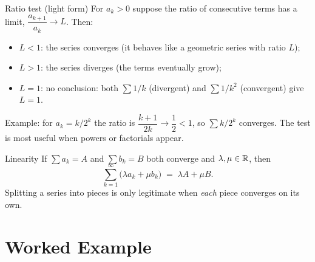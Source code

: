 \begin{rulebox}{Ratio test (light form)}
For $a_k>0$ suppose the ratio of consecutive terms has a limit,
$\dfrac{a_{k+1}}{a_k}\to L$. Then:
\begin{itemize}[leftmargin=1.6em,itemsep=0.3ex]
  \item $L<1$: the series converges (it behaves like a geometric series
        with ratio $L$);
  \item $L>1$: the series diverges (the terms eventually grow);
  \item $L=1$: no conclusion: both $\sum 1/k$ (divergent) and
        $\sum 1/k^{2}$ (convergent) give $L=1$.
\end{itemize}
Example: for $a_k=k/2^{k}$ the ratio is
$\dfrac{k+1}{2k}\to\dfrac12<1$, so $\sum k/2^{k}$ converges. The test is most useful when powers or factorials appear.
\end{rulebox}

\begin{rulebox}{Linearity}
If $\sum a_k=A$ and $\sum b_k=B$ both converge and $\lambda,\mu\in\mathbb{R}$, then
\[
  \sum_{k=1}^{\infty}\bigl(\lambda a_k+\mu b_k\bigr)
  \;=\; \lambda A+\mu B .
\]
Splitting a series into pieces is only legitimate when \emph{each} piece
converges on its own.
\end{rulebox}

\section{Worked Example}

